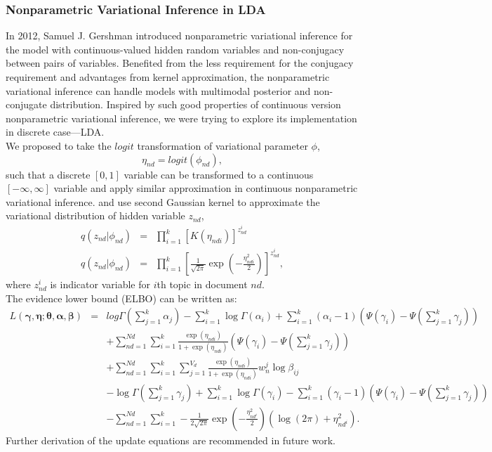 \documentclass{article}
\begin{document}
\subsubsection{Nonparametric Variational Inference in LDA}
In 2012, Samuel J. Gershman introduced nonparametric variational inference for the model with continuous-valued hidden random variables and non-conjugacy between pairs of variables. Benefited from the less requirement for the conjugacy requirement and advantages from kernel approximation, the nonparametric variational inference can handle models with multimodal posterior and non-conjugate distribution. Inspired by such good properties of continuous version nonparametric variational inference, we were trying to explore its implementation in discrete case---LDA.\\
We proposed to take the $logit$ transformation of variational parameter $\phi$,
$$\eta_{nd}=logit(\phi_{nd}),$$
such that a discrete $[0,1]$ variable can be transformed to a continuous $[-\infty,\infty]$ variable and apply similar approximation in continuous nonparametric variational inference. 
and use second Gaussian kernel to approximate the variational distribution of hidden variable $z_{nd}$,
\begin{eqnarray*}
	q(z_{nd}|\phi_{nd})&=&\prod_{i=1}^k[K(\eta_{ndi})]^{z_{nd}^i}\\
	q(z_{nd}|\phi_{nd})&=&\prod_{i=1}^k[\frac{1}{
		\sqrt{2\pi}}\exp(-\frac{\eta_{ndi}^2}{2})]^{z_{nd}^i},
\end{eqnarray*}
where $z_{nd}^i$ is indicator variable for $i$th topic in document $nd$.\\
The evidence lower bound (ELBO) can be written as:
\begin{eqnarray*}
	L(\bm{\gamma},\bm{\eta};\bm{\theta},\bm{\alpha},\bm{\beta}) &=& log \Gamma(\sum_{j=1}^{k}\alpha_j)-\sum_{i=1}^k\log \Gamma(\alpha_i)+\sum_{i=1}^k(\alpha_i-1)(\Psi(\gamma_i)-\Psi(\sum_{j=1}^k\gamma_j))\\
	& & +\sum_{nd=1}^{Nd}\sum_{i=1}^{k}\frac{\exp(\eta_{ndi})}{1+\exp(\eta_{ndi})}(\Psi(\gamma_i)-\Psi(\sum_{j=1}^k\gamma_j))\\
	& & + \sum_{nd=1}^{Nd}\sum_{i=1}^{k}\sum_{j=1}^{V_d}\frac{\exp(\eta_{ndi})}{1+\exp(\eta_{ndi})}w_n^j\log\beta_{ij}\\
	&& - \log \Gamma(\sum_{j=1}^k\gamma_j)+\sum_{i=1}^k\log \Gamma(\gamma_i)-\sum_{i=1}^k(\gamma_i-1)(\Psi(\gamma_i)-\Psi(\sum_{j=1}^k\gamma_j))\\
	&& -\sum_{nd=1}^{Nd}\sum_{i=1}^{k}-\frac{1}{2\sqrt{2\pi}}\exp(-\frac{\eta_{{nd}^i}^2}{2})(\log(2\pi)+\eta_{nd^i}^2).
\end{eqnarray*}
Further derivation of the update equations are recommended in future work. 
\end{document}

